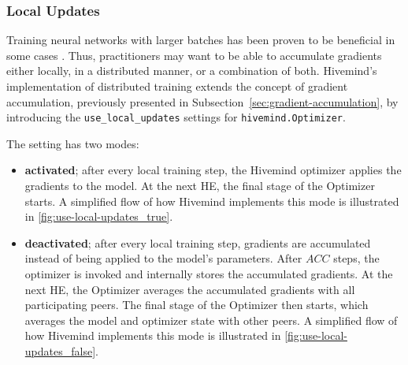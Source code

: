 \subsubsection{Local Updates}

Training neural networks with larger batches has been proven to be beneficial in some cases \cite{Krizhevsky2014owt, goyal2017accurate, you2017scaling}.
Thus, practitioners may want to be able to accumulate gradients either locally, in a distributed manner, or a combination of both.
Hivemind's implementation of distributed training extends the concept of gradient accumulation, previously presented in Subsection~\ref{sec:gradient-accumulation}, by introducing the \texttt{use\_local\_updates} settings for \texttt{hivemind.Optimizer}.

The setting has two modes:
\begin{itemize}
    \item \textbf{activated}; after every local training step, the Hivemind optimizer applies the gradients to the model.
          At the next HE, the final stage of the Optimizer starts.
          A simplified flow of how Hivemind implements this mode is illustrated in \autoref{fig:use-local-updates_true}.
    \item \textbf{deactivated}; after every local training step, gradients are accumulated instead of being applied to the model's parameters.
          After $ACC$ steps, the optimizer is invoked and internally stores the accumulated gradients.
          At the next HE, the Optimizer averages the accumulated gradients with all participating peers.
          The final stage of the Optimizer then starts, which averages the model and optimizer state with other peers.
          A simplified flow of how Hivemind implements this mode is illustrated in \autoref{fig:use-local-updates_false}.
\end{itemize}

